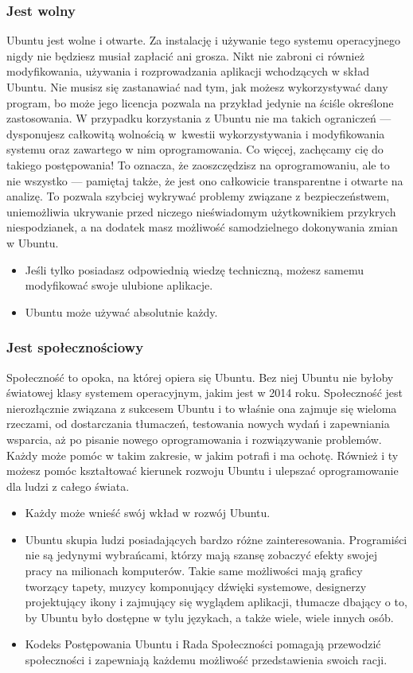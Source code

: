 \subsubsection{Jest wolny}
Ubuntu jest wolne i otwarte. Za instalację i używanie tego systemu operacyjnego nigdy nie będziesz musiał zapłacić ani grosza. Nikt nie zabroni ci również modyfikowania, używania i rozprowadzania aplikacji wchodzących w skład Ubuntu. Nie musisz się zastanawiać nad tym, jak możesz wykorzystywać dany program, bo może jego licencja pozwala na przykład jedynie na ściśle określone zastosowania. W przypadku korzystania z Ubuntu nie ma takich ograniczeń --- dysponujesz całkowitą wolnością w~kwestii wykorzystywania i modyfikowania systemu oraz zawartego w nim oprogramowania.
Co więcej, zachęcamy cię do takiego postępowania! To oznacza, że zaoszczędzisz na oprogramowaniu, ale to nie wszystko --- pamiętaj także, że jest ono całkowicie transparentne i otwarte na analizę. To pozwala szybciej wykrywać problemy związane z bezpieczeństwem, uniemożliwia ukrywanie przed niczego nieświadomym użytkownikiem przykrych niespodzianek, a na dodatek masz możliwość samodzielnego dokonywania zmian w Ubuntu.
\begin{itemize}
\item Jeśli tylko posiadasz odpowiednią wiedzę techniczną, możesz samemu modyfikować swoje ulubione aplikacje.
\item Ubuntu może używać absolutnie każdy.
\end{itemize}
\subsubsection{Jest społecznościowy}
Społeczność to opoka, na której opiera się Ubuntu. Bez niej Ubuntu nie byłoby światowej klasy systemem operacyjnym, jakim jest w 2014 roku. Społeczność jest nierozłącznie związana z sukcesem Ubuntu i to właśnie ona zajmuje się wieloma rzeczami, od dostarczania tłumaczeń, testowania nowych wydań i zapewniania wsparcia, aż po pisanie nowego oprogramowania i rozwiązywanie problemów. Każdy może pomóc w takim zakresie, w jakim potrafi i ma ochotę. Również i ty możesz pomóc kształtować kierunek rozwoju Ubuntu i ulepszać oprogramowanie dla ludzi z całego świata.
\begin{itemize}
\item Każdy może wnieść swój wkład w rozwój Ubuntu.
\item Ubuntu skupia ludzi posiadających bardzo różne zainteresowania. Programiści nie są jedynymi wybrańcami, którzy mają szansę zobaczyć efekty swojej pracy na milionach komputerów. Takie same możliwości mają graficy tworzący tapety, muzycy komponujący dźwięki systemowe, designerzy projektujący ikony i zajmujący się wyglądem aplikacji, tłumacze dbający o to, by Ubuntu było dostępne w tylu językach, a także wiele, wiele innych osób.
\item Kodeks Postępowania Ubuntu i Rada Społeczności pomagają przewodzić społeczności i zapewniają każdemu możliwość przedstawienia swoich racji.
\end{itemize}
\clearpage
